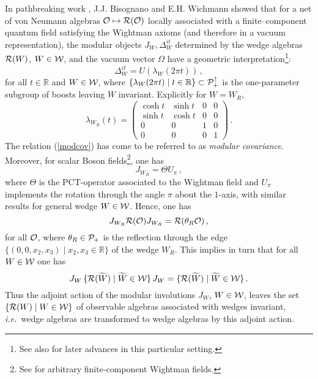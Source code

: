 \documentclass[12pt]{article}
\newcommand{\ie}{{\it i.e.\ }}
\def\Os{{\cal O}}
\def\Ps{{\cal P}}
\def\Rs{{\cal R}}
\def\Ws{{\cal W}}
\def\Pid{{\Ps_+ ^{\uparrow}}}
\def\RR{{\mathbb R}}
\begin{document}
     In pathbreaking work \cite{BW1,BW2}, J.J. Bisognano and
E.H. Wichmann showed that for a net of von Neumann algebras 
$\Os \mapsto \Rs(\Os)$ locally associated with a finite--component 
quantum field satisfying the Wightman axioms \cite{Jo,StWi,BLT} 
(and therefore in a vacuum representation), the modular objects 
$J_W, \Delta_W^{it}$ determined by the wedge algebras 
$\Rs(W)$, $W \in \Ws$, and the vacuum vector $\Omega$ have a geometric 
interpretation\footnote{See also \cite{DrSuWi} for later advances in 
this particular setting.}:
% 
\begin{equation} \label{modcov}
\Delta_W^{it} = U(\lambda_W(2\pi t)) \, , 
\end{equation}
%
for all $t \in \RR$ and $W \in \Ws$, where 
$\{\lambda_W(2\pi t) \mid t \in\RR\} \subset \Pid$ is the one-parameter 
subgroup of boosts leaving $W$ invariant. Explicitly for $W = W_R$,
%
$$ \lambda_{W_R}(t) =  
              \left( \begin{array}{cccc} \cosh t & \sinh t & 0 & 0 \\ 
                     \sinh t & \cosh t & 0 & 0 \\
                     0 & 0 & 1 & 0 \\
                     0 & 0 & 0 & 1  \end{array} \right)   \, .  $$
%
The relation (\ref{modcov}) has come to be referred to as {\it modular
covariance}. Moreover, for scalar Boson fields\footnote{See \cite{BW2} 
for arbitrary finite-component Wightman fields.}, one has
%
\begin{equation} \label{Jtheta}
J_{W_R} = \Theta U_{\pi} \, ,
\end{equation}
%
where $\Theta$ is the PCT-operator associated to the Wightman field
and $U_{\pi}$ implements the rotation through the angle $\pi$ about 
the $1$-axis, with similar results for general wedge $W \in \Ws$.
Hence, one has
%
\begin{equation} \label{Jcgma}
J_{W_R} \Rs(\Os) J_{W_R} = \Rs(\theta_R \Os) \, ,
\end{equation}
%
for all $\Os$, where $\theta_R \in \Ps_+$ is the reflection through 
the edge \newline
$\{ (0,0,x_2,x_3) \mid x_2,x_3 \in \RR \}$ of the wedge $W_R$. This
implies in turn that for all $W \in \Ws$ one has
%
\begin{equation} \label{BWcgma}
J_{W} \, \{ \Rs(\widetilde{W}) \mid \widetilde{W} \in \Ws \} \, J_{W} = 
\{ \Rs(\widetilde{W}) \mid \widetilde{W} \in \Ws \} \, .
\end{equation}
%
Thus the adjoint action of the modular involutions $J_W$, $W \in \Ws$, 
leaves the set \newline
$\{ \Rs(W) \mid W \in \Ws \}$ of observable algebras associated
with wedges invariant, \ie wedge algebras are transformed to wedge
algebras by this adjoint action.
\end{document}
